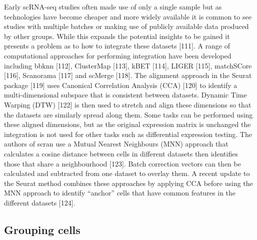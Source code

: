 \documentclass[11pt,a4paper,titlepage,twoside,openright]{style/unimelbthesis}
\theoremstyle{definition}
\theoremstyle{definition}
\theoremstyle{definition}
\theoremstyle{remark}
\begin{document}
\begin{mainmatter}
Early scRNA-seq studies often made use of only a single sample but as technologies have become cheaper and more widely available it is common to see studies with multiple batches or making use of publicly available data produced by other groups. While this expands the potential insights to be gained it presents a problem as to how to integrate these datasets {[}111{]}. A range of computational approaches for performing integration have been developed including bbknn {[}112{]}, ClusterMap {[}113{]}, kBET {[}114{]}, LIGER {[}115{]}, matchSCore {[}116{]}, Scanorama {[}117{]} and scMerge {[}118{]}. The alignment approach in the Seurat package {[}119{]} uses Canonical Correlation Analysis (CCA) {[}120{]} to identify a multi-dimensional subspace that is consistent between datasets. Dynamic Time Warping (DTW) {[}122{]} is then used to stretch and align these dimensions so that the datasets are similarly spread along them. Some tasks can be performed using these aligned dimensions, but as the original expression matrix is unchanged the integration is not used for other tasks such as differential expression testing. The authors of scran use a Mutual Nearest Neighbours (MNN) approach that calculates a cosine distance between cells in different datasets then identifies those that share a neighbourhood {[}123{]}. Batch correction vectors can then be calculated and subtracted from one dataset to overlay them. A recent update to the Seurat method combines these approaches by applying CCA before using the MNN approach to identify \enquote{anchor} cells that have common features in the different datasets {[}124{]}.

\hypertarget{grouping-cells}{%
\subsection{Grouping cells}\label{grouping-cells}}


\end{mainmatter}
\end{document}
